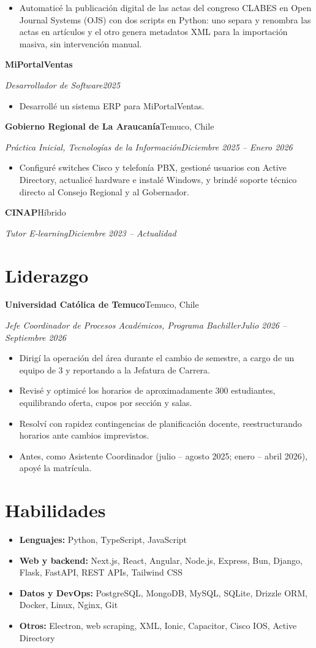 \documentclass[10pt,letterpaper]{article}
\newcommand{\entry}[4]{%
  \textbf{#1}\hfill #2\par\nopagebreak
  \textit{#3}\hfill \textit{#4}\par\nopagebreak\vspace{0.05em}}
\newcommand{\gap}{\vspace{0.22em}}
\begin{document}
\begin{itemize}
  \item Automaticé la publicación digital de las actas del congreso CLABES en Open Journal Systems (OJS) con dos scripts en Python: uno separa y renombra las actas en artículos y el otro genera metadatos XML para la importación masiva, sin intervención manual.
\end{itemize}
\gap
\entry{MiPortalVentas}{}{Desarrollador de Software}{2025}
\begin{itemize}
  \item Desarrollé un sistema ERP para MiPortalVentas.
\end{itemize}
\gap
\entry{Gobierno Regional de La Araucanía}{Temuco, Chile}{Práctica Inicial, Tecnologías de la Información}{Diciembre 2025 -- Enero 2026}
\begin{itemize}
  \item Configuré switches Cisco y telefonía PBX, gestioné usuarios con Active Directory, actualicé hardware e instalé Windows, y brindé soporte técnico directo al Consejo Regional y al Gobernador.
\end{itemize}
\gap
\entry{CINAP}{Híbrido}{Tutor E-learning}{Diciembre 2023 -- Actualidad}

\section{Liderazgo}
\entry{Universidad Católica de Temuco}{Temuco, Chile}{Jefe Coordinador de Procesos Académicos, Programa Bachiller}{Julio 2026 -- Septiembre 2026}
\begin{itemize}
  \item Dirigí la operación del área durante el cambio de semestre, a cargo de un equipo de 3 y reportando a la Jefatura de Carrera.
  \item Revisé y optimicé los horarios de aproximadamente 300 estudiantes, equilibrando oferta, cupos por sección y salas.
  \item Resolví con rapidez contingencias de planificación docente, reestructurando horarios ante cambios imprevistos.
  \item Antes, como Asistente Coordinador (julio -- agosto 2025; enero -- abril 2026), apoyé la matrícula.
\end{itemize}

\section{Habilidades}
\begin{itemize}[label={}, leftmargin=0pt]
  \item \textbf{Lenguajes:} Python, TypeScript, JavaScript
  \item \textbf{Web y backend:} Next.js, React, Angular, Node.js, Express, Bun, Django, Flask, FastAPI, REST APIs, Tailwind CSS
  \item \textbf{Datos y DevOps:} PostgreSQL, MongoDB, MySQL, SQLite, Drizzle ORM, Docker, Linux, Nginx, Git
  \item \textbf{Otros:} Electron, web scraping, XML, Ionic, Capacitor, Cisco IOS, Active Directory
\end{itemize}
\end{document}
